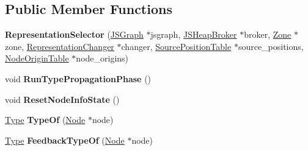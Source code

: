 \subsection*{Public Member Functions}
\begin{DoxyCompactItemize}
\item 
\mbox{\label{classv8_1_1internal_1_1compiler_1_1RepresentationSelector_a2fd81ce4d25509c87c0d094cf9538509}} 
{\bfseries Representation\+Selector} (\mbox{\hyperlink{classv8_1_1internal_1_1compiler_1_1JSGraph}{J\+S\+Graph}} $\ast$jsgraph, \mbox{\hyperlink{classv8_1_1internal_1_1compiler_1_1JSHeapBroker}{J\+S\+Heap\+Broker}} $\ast$broker, \mbox{\hyperlink{classv8_1_1internal_1_1Zone}{Zone}} $\ast$zone, \mbox{\hyperlink{classv8_1_1internal_1_1compiler_1_1RepresentationChanger}{Representation\+Changer}} $\ast$changer, \mbox{\hyperlink{classv8_1_1internal_1_1compiler_1_1SourcePositionTable}{Source\+Position\+Table}} $\ast$source\+\_\+positions, \mbox{\hyperlink{classv8_1_1internal_1_1compiler_1_1NodeOriginTable}{Node\+Origin\+Table}} $\ast$node\+\_\+origins)
\item 
\mbox{\label{classv8_1_1internal_1_1compiler_1_1RepresentationSelector_a23eb4f937ae863461025cf0b0a56ce73}} 
void {\bfseries Run\+Type\+Propagation\+Phase} ()
\item 
\mbox{\label{classv8_1_1internal_1_1compiler_1_1RepresentationSelector_aa9cda8d0b7f07fea2d8b336d30be1b6c}} 
void {\bfseries Reset\+Node\+Info\+State} ()
\item 
\mbox{\label{classv8_1_1internal_1_1compiler_1_1RepresentationSelector_a2dd0290eacf01b17961390f5419b2548}} 
\mbox{\hyperlink{classv8_1_1internal_1_1compiler_1_1Type}{Type}} {\bfseries Type\+Of} (\mbox{\hyperlink{classv8_1_1internal_1_1compiler_1_1Node}{Node}} $\ast$node)
\item 
\mbox{\label{classv8_1_1internal_1_1compiler_1_1RepresentationSelector_adde94e147fab95d9a143e491e790b184}} 
\mbox{\hyperlink{classv8_1_1internal_1_1compiler_1_1Type}{Type}} {\bfseries Feedback\+Type\+Of} (\mbox{\hyperlink{classv8_1_1internal_1_1compiler_1_1Node}{Node}} $\ast$node)

\end{DoxyCompactItemize}
